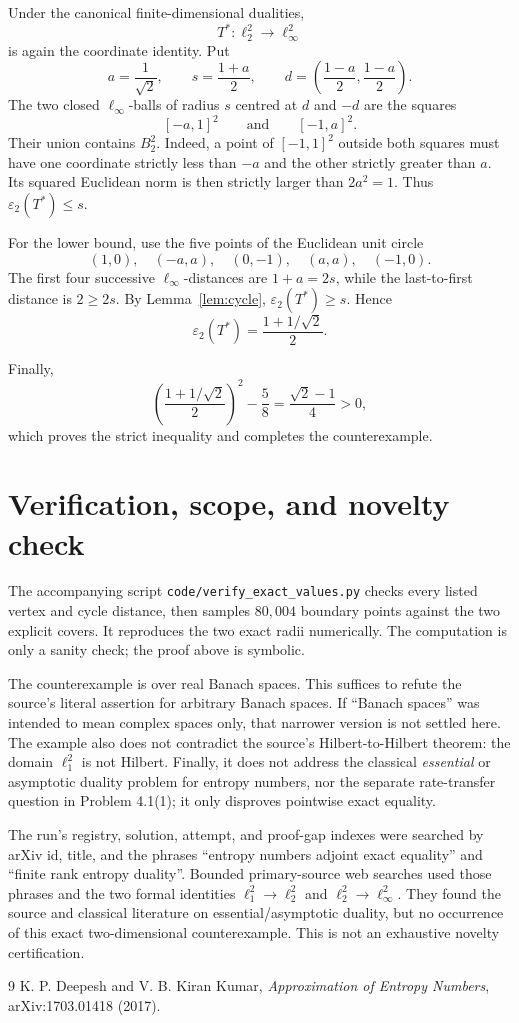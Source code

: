 \documentclass[11pt]{article}
\newcommand{\eps}{\varepsilon}
\begin{document}
Under the canonical finite-dimensional dualities,
\[
 T^*:\ell_2^2\longrightarrow\ell_\infty^2
\]
is again the coordinate identity.  Put
\[
 a=\frac1{\sqrt2},\qquad
 s=\frac{1+a}{2},\qquad
 d=\left(\frac{1-a}{2},\frac{1-a}{2}\right).
\]
The two closed $\ell_\infty$-balls of radius $s$ centred at $d$ and $-d$ are
the squares
\[
                  [-a,1]^2
                  \qquad\text{and}\qquad
                  [-1,a]^2.
\]
Their union contains $B_2^2$.  Indeed, a point of $[-1,1]^2$ outside both
squares must have one coordinate strictly less than $-a$ and the other
strictly greater than $a$.  Its squared Euclidean norm is then strictly larger
than $2a^2=1$.  Thus $\eps_2(T^*)\le s$.

For the lower bound, use the five points of the Euclidean unit circle
\[
 (1,0),\quad (-a,a),\quad (0,-1),\quad (a,a),\quad (-1,0).
\]
The first four successive $\ell_\infty$-distances are
$1+a=2s$, while the last-to-first distance is $2\ge2s$.  By
Lemma~\ref{lem:cycle}, $\eps_2(T^*)\ge s$.  Hence
\[
                         \eps_2(T^*)=\frac{1+1/\sqrt2}{2}.
\]

Finally,
\[
 \left(\frac{1+1/\sqrt2}{2}\right)^2-\frac58
 =\frac{\sqrt2-1}{4}>0,
\]
which proves the strict inequality and completes the counterexample.

\section{Verification, scope, and novelty check}

The accompanying script \texttt{code/verify\_exact\_values.py} checks every
listed vertex and cycle distance, then samples $80{,}004$ boundary points
against the two explicit covers.  It reproduces the two exact radii
numerically.  The computation is only a sanity check; the proof above is
symbolic.

The counterexample is over real Banach spaces.  This suffices to refute the
source's literal assertion for arbitrary Banach spaces.  If ``Banach spaces''
was intended to mean complex spaces only, that narrower version is not
settled here.  The example also does not contradict the source's
Hilbert-to-Hilbert theorem: the domain $\ell_1^2$ is not Hilbert.  Finally, it
does not address the classical \emph{essential} or asymptotic duality problem
for entropy numbers, nor the separate rate-transfer question in Problem
4.1(1); it only disproves pointwise exact equality.

The run's registry, solution, attempt, and proof-gap indexes were searched by
arXiv id, title, and the phrases ``entropy numbers adjoint exact equality'' and
``finite rank entropy duality''.  Bounded primary-source web searches used
those phrases and the two formal identities
$\ell_1^2\to\ell_2^2$ and $\ell_2^2\to\ell_\infty^2$.  They found the source
and classical literature on essential/asymptotic duality, but no occurrence
of this exact two-dimensional counterexample.  This is not an exhaustive
novelty certification.

\begin{thebibliography}{9}
K. P. Deepesh and V. B. Kiran Kumar,
\emph{Approximation of Entropy Numbers}, arXiv:1703.01418 (2017).
\end{thebibliography}
\end{document}
